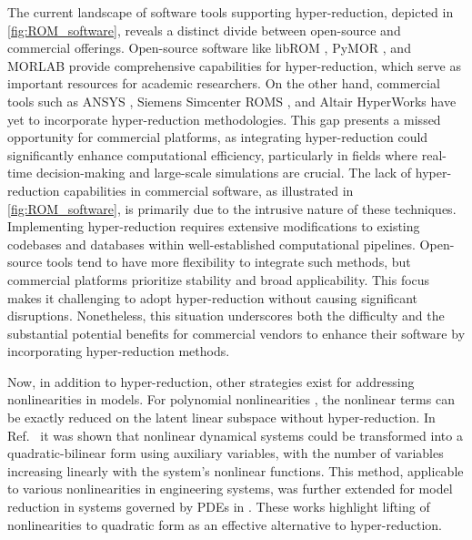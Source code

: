 \documentclass[11pt]{article}
\begin{document}
    The current landscape of software tools supporting hyper-reduction, depicted in \cref{fig:ROM_software}, reveals a distinct divide between open-source and commercial offerings.
    Open-source software like libROM \cite{Choi2019libROM}, PyMOR \cite{milk2016pymor}, and MORLAB \cite{BenW21c} provide comprehensive capabilities for hyper-reduction, which serve as important resources for academic researchers.
    On the other hand, commercial tools such as ANSYS \cite{asgari2014application,pliuhin2023implementation}, Siemens Simcenter ROMS \cite{Siemens2021simcenterd}, and Altair HyperWorks \cite{lindqvist2022method} have yet to incorporate hyper-reduction methodologies.
    This gap presents a missed opportunity for commercial platforms, as integrating hyper-reduction could significantly enhance computational efficiency, particularly in fields where real-time decision-making and large-scale simulations are crucial.
    The lack of hyper-reduction capabilities in commercial software, as illustrated in \cref{fig:ROM_software}, is primarily due to the intrusive nature of these techniques.
    Implementing hyper-reduction requires extensive modifications to existing codebases and databases within well-established computational pipelines.
    Open-source tools tend to have more flexibility to integrate such methods, but commercial platforms prioritize stability and broad applicability.
    This focus makes it challenging to adopt hyper-reduction without causing significant disruptions.
    Nonetheless, this situation underscores both the difficulty and the substantial potential benefits for commercial vendors to enhance their software by incorporating hyper-reduction methods.


    Now, in addition to hyper-reduction, other strategies exist for addressing nonlinearities in models.
    For polynomial nonlinearities \cite{ghattas2021learning}, the nonlinear terms can be exactly reduced on the latent linear subspace without hyper-reduction.
    In Ref.~\cite{gu2011qlmor} it was shown that nonlinear dynamical systems could be transformed into a quadratic-bilinear form using auxiliary variables, with the number of variables increasing linearly with the system's nonlinear functions.
    This method, applicable to various nonlinearities in engineering systems, was further extended for model reduction in systems governed by PDEs in \cite{benner2015two-sided,kramer2019nonlinear,kramer2021balanced}.
    These works highlight lifting of nonlinearities to quadratic form as an effective alternative to hyper-reduction.
\end{document}
